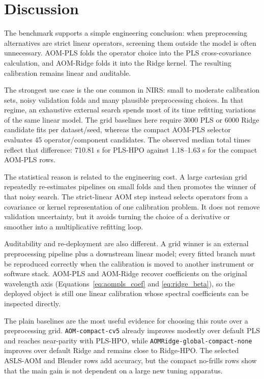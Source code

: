 \documentclass[11pt,a4paper]{article}
\begin{document}
\section{Discussion}

The benchmark supports a simple engineering conclusion: when preprocessing
alternatives are strict linear operators, screening them outside the model is
often unnecessary.  AOM-PLS folds the operator choice into the PLS
cross-covariance calculation, and AOM-Ridge folds it into the Ridge kernel.
The resulting calibration remains linear and auditable.

The strongest use case is the one common in NIRS: small to moderate
calibration sets, noisy validation folds and many plausible preprocessing
choices.  In that regime, an exhaustive external search spends most of its
time refitting variations of the same linear model.  The grid baselines here
require 3000 PLS or 6000 Ridge candidate fits per dataset/seed, whereas the
compact AOM-PLS selector evaluates 45 operator/component candidates.  The
observed median total times reflect that difference: 710.81 s for PLS-HPO
against 1.18--1.63 s for the compact AOM-PLS rows.

The statistical reason is related to the engineering cost.  A large cartesian
grid repeatedly re-estimates pipelines on small folds and then promotes the
winner of that noisy search.  The strict-linear AOM step instead selects
operators from a covariance or kernel representation of one calibration
problem.  It does not remove validation uncertainty, but it avoids turning the
choice of a derivative or smoother into a multiplicative refitting loop.

Auditability and re-deployment are also different.  A grid winner is an
external preprocessing pipeline plus a downstream linear model; every fitted
branch must be reproduced correctly when the calibration is moved to another
instrument or software stack.  AOM-PLS and AOM-Ridge recover coefficients on
the original wavelength axis (Equations~\ref{eq:aompls_coef} and
\ref{eq:ridge_beta}), so the deployed object is still one linear calibration
whose spectral coefficients can be inspected directly.

The plain baselines are the most useful evidence for choosing this route over
a preprocessing grid.  \texttt{AOM-compact-cv5} already improves modestly over
default PLS and reaches near-parity with PLS-HPO, while
\texttt{AOMRidge-global-compact-none} improves over default Ridge and remains
close to Ridge-HPO.  The selected ASLS-AOM and Blender rows add accuracy, but
the compact no-frills rows show that the main gain is not dependent on a large
new tuning apparatus.
\end{document}
